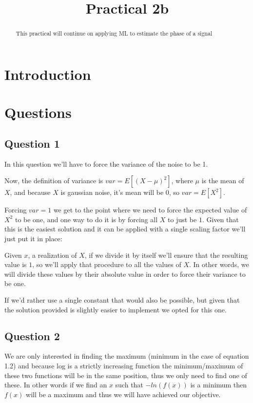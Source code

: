 \documentclass[conference,9pt]{IEEEtran}
\begin{document}
\title{Practical 2b}

\author{
}


\maketitle
\begin{abstract}
This practical will continue on applying ML to estimate the phase of a signal
\end{abstract}



\section{Introduction}

\section{Questions}

\subsection{Question 1}
In this question we'll have to force the variance of the noise to be 1.

Now, the definition of variance is $var=E[(X-\mu)^2]$, where $\mu$ is the mean of $X$, and because $X$ is gaussian noise, it's mean will be 0, so $var=E[X^2]$.

Forcing $var=1$ we get to the point where we need to force the expected value of $X^2$ to be one, and one way to do it is by forcing all $X$ to just be $1$. Given that this is the easiest solution and it can be applied with a single scaling factor we'll just put it in place:

Given $x$, a realization of $X$, if we divide it by itself we'll ensure that the resulting value is $1$, so we'll apply that procedure to all the values of $X$. In other words, we will divide these values by their absolute value in order to force their variance to be one.

If we'd rather use a single constant that would also be possible, but given that the solution provided is slightly easier to implement we opted for this one.

\subsection{Question 2}
We are only interested in finding the maximum (minimum in the case of equation 1.2) and because log is a strictly increasing function the minimum/maximum of these two functions will be in the same position, thus we only need to find one of these. In other words if we find an $x$ such that $-ln(f(x))$ is a minimum then $f(x)$ will be a maximum and thus we will have achieved our objective.
\end{document}
